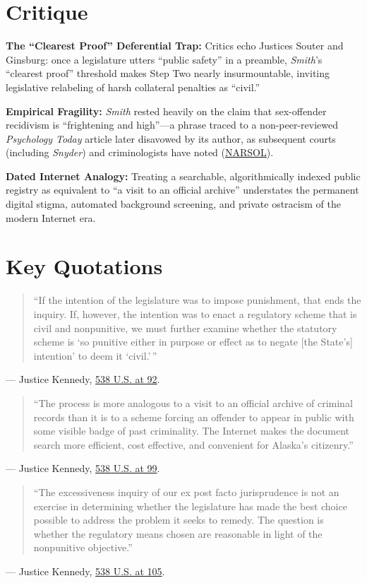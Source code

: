\documentclass[12pt]{article}
\begin{document}
\section{Critique}
\textbf{The ``Clearest Proof'' Deferential Trap:} Critics echo Justices Souter and Ginsburg: once a legislature utters ``public safety'' in a preamble, \textit{Smith}'s ``clearest proof'' threshold makes Step Two nearly insurmountable, inviting legislative relabeling of harsh collateral penalties as ``civil.''

\textbf{Empirical Fragility:} \textit{Smith} rested heavily on the claim that sex-offender recidivism is ``frightening and high''---a phrase traced to a non-peer-reviewed \textit{Psychology Today} article later disavowed by its author, as subsequent courts (including \textit{Snyder}) and criminologists have noted (\href{https://www.narsol.org/scotus0125/}{NARSOL}).

\textbf{Dated Internet Analogy:} Treating a searchable, algorithmically indexed public registry as equivalent to ``a visit to an official archive'' understates the permanent digital stigma, automated background screening, and private ostracism of the modern Internet era.

\section{Key Quotations}
\begin{quote}
``If the intention of the legislature was to impose punishment, that ends the inquiry. If, however, the intention was to enact a regulatory scheme that is civil and nonpunitive, we must further examine whether the statutory scheme is `so punitive either in purpose or effect as to negate [the State's] intention' to deem it `civil.'\,''
\end{quote}
\noindent --- Justice Kennedy, \href{https://www.law.cornell.edu/supct/html/01-729.ZO.html}{538 U.S. at 92}.

\begin{quote}
``The process is more analogous to a visit to an official archive of criminal records than it is to a scheme forcing an offender to appear in public with some visible badge of past criminality. The Internet makes the document search more efficient, cost effective, and convenient for Alaska's citizenry.''
\end{quote}
\noindent --- Justice Kennedy, \href{https://www.law.cornell.edu/supct/html/01-729.ZO.html}{538 U.S. at 99}.

\begin{quote}
``The excessiveness inquiry of our ex post facto jurisprudence is not an exercise in determining whether the legislature has made the best choice possible to address the problem it seeks to remedy. The question is whether the regulatory means chosen are reasonable in light of the nonpunitive objective.''
\end{quote}
\noindent --- Justice Kennedy, \href{https://www.law.cornell.edu/supct/html/01-729.ZO.html}{538 U.S. at 105}.
\end{document}
